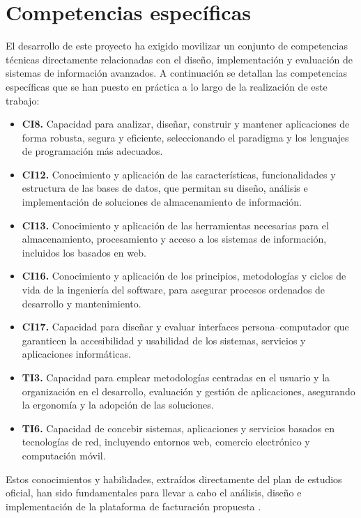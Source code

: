 \section{Competencias específicas}
\begin{large}
El desarrollo de este proyecto ha exigido movilizar un conjunto de competencias técnicas directamente relacionadas con el diseño, implementación y evaluación de sistemas de información avanzados. A continuación se detallan las competencias específicas que se han puesto en práctica a lo largo de la realización de este trabajo:

\begin{itemize}
  \item \textbf{CI8.} Capacidad para analizar, diseñar, construir y mantener aplicaciones de forma robusta, segura y eficiente, seleccionando el paradigma y los lenguajes de programación más adecuados.  
  \item \textbf{CI12.} Conocimiento y aplicación de las características, funcionalidades y estructura de las bases de datos, que permitan su diseño, análisis e implementación de soluciones de almacenamiento de información.  
  \item \textbf{CI13.} Conocimiento y aplicación de las herramientas necesarias para el almacenamiento, procesamiento y acceso a los sistemas de información, incluidos los basados en web.  
  \item \textbf{CI16.} Conocimiento y aplicación de los principios, metodologías y ciclos de vida de la ingeniería del software, para asegurar procesos ordenados de desarrollo y mantenimiento.  
  \item \textbf{CI17.} Capacidad para diseñar y evaluar interfaces persona–computador que garanticen la accesibilidad y usabilidad de los sistemas, servicios y aplicaciones informáticas.  
  \item \textbf{TI3.} Capacidad para emplear metodologías centradas en el usuario y la organización en el desarrollo, evaluación y gestión de aplicaciones, asegurando la ergonomía y la adopción de las soluciones.  
  \item \textbf{TI6.} Capacidad de concebir sistemas, aplicaciones y servicios basados en tecnologías de red, incluyendo entornos web, comercio electrónico y computación móvil.
\end{itemize}

Estos conocimientos y habilidades, extraídos directamente del plan de estudios oficial, han sido fundamentales para llevar a cabo el análisis, diseño e implementación de la plataforma de facturación propuesta \cite{grado2024ulpgc}.
\end{large}


